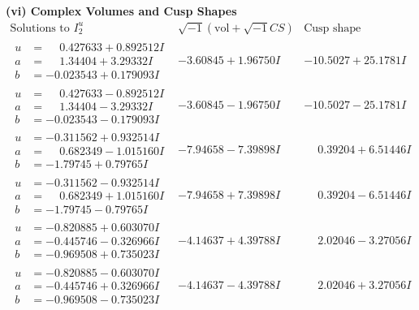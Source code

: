 \documentclass[1p]{elsarticle_modified}
\theoremstyle{definition}
\newcommand{\I}{\sqrt{-1}}
\begin{document}
\newpage\flushleft \textbf{(vi) Complex Volumes and Cusp Shapes}
$$\begin{array}{c|c|c}  
\text{Solutions to }I^u_{2}& \I (\text{vol} + \sqrt{-1}CS) & \text{Cusp shape}\\
 \hline 
\begin{aligned}
u &= \phantom{-}0.427633 + 0.892512 I \\
a &= \phantom{-}1.34404 + 3.29332 I \\
b &= -0.023543 + 0.179093 I\end{aligned}
 & -3.60845 + 1.96750 I & -10.5027 + 25.1781 I \\ \hline\begin{aligned}
u &= \phantom{-}0.427633 - 0.892512 I \\
a &= \phantom{-}1.34404 - 3.29332 I \\
b &= -0.023543 - 0.179093 I\end{aligned}
 & -3.60845 - 1.96750 I & -10.5027 - 25.1781 I \\ \hline\begin{aligned}
u &= -0.311562 + 0.932514 I \\
a &= \phantom{-}0.682349 - 1.015160 I \\
b &= -1.79745 + 0.79765 I\end{aligned}
 & -7.94658 - 7.39898 I & \phantom{-}0.39204 + 6.51446 I \\ \hline\begin{aligned}
u &= -0.311562 - 0.932514 I \\
a &= \phantom{-}0.682349 + 1.015160 I \\
b &= -1.79745 - 0.79765 I\end{aligned}
 & -7.94658 + 7.39898 I & \phantom{-}0.39204 - 6.51446 I \\ \hline\begin{aligned}
u &= -0.820885 + 0.603070 I \\
a &= -0.445746 - 0.326966 I \\
b &= -0.969508 + 0.735023 I\end{aligned}
 & -4.14637 + 4.39788 I & \phantom{-}2.02046 - 3.27056 I \\ \hline\begin{aligned}
u &= -0.820885 - 0.603070 I \\
a &= -0.445746 + 0.326966 I \\
b &= -0.969508 - 0.735023 I\end{aligned}
 & -4.14637 - 4.39788 I & \phantom{-}2.02046 + 3.27056 I \\ \hline\begin{aligned}

\end{aligned}
\end{array}$$
\end{document}
